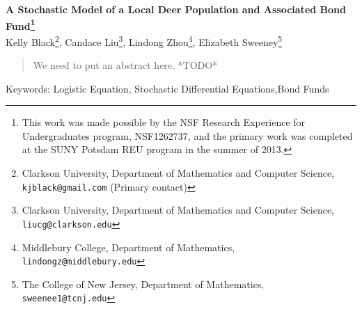 \documentclass[12pt]{article}
\begin{document}
\begin{center}
  \textbf{A Stochastic Model of a Local Deer Population and Associated
    Bond Fund\footnote{This work was made possible by the NSF Research
      Experience for Undergraduates program, NSF1262737, and the
      primary work was completed at the SUNY Potsdam REU program in
      the summer of 2013.}} \\
  Kelly Black\footnote{Clarkson University, Department of Mathematics
    and Computer Science, \texttt{kjblack@gmail.com} (Primary contact)},
    Candace Liu\footnote{Clarkson University, Department of Mathematics
      and Computer Science, \texttt{liucg@clarkson.edu}},
    Lindong Zhou\footnote{Middlebury College, Department of Mathematics, 
      \texttt{lindongz@middlebury.edu}}, 
    Elizabeth Sweeney\footnote{The College of New Jersey, Department of Mathematics, 
      \texttt{sweenee1@tcnj.edu}}
\end{center}


\begin{abstract}
We need to put an abstract here. *TODO*
\end{abstract}


Keywords: Logistic Equation, Stochastic Differential Equations,Bond Funds
















\end{document}
